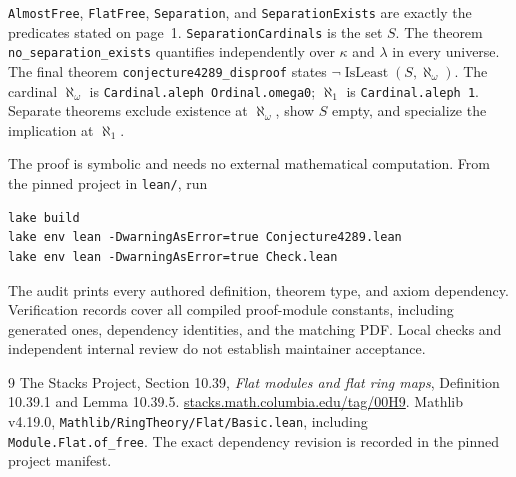 \documentclass[11pt]{article}
\begin{document}
\texttt{AlmostFree}, \texttt{FlatFree}, \texttt{Separation}, and
\texttt{SeparationExists} are exactly the predicates stated on page~1.
\texttt{SeparationCardinals} is the set $S$.
The theorem \texttt{no\_separation\_exists} quantifies independently over
$\kappa$ and $\lambda$ in every universe. The final theorem
\texttt{conjecture4289\_disproof} states
$\neg\operatorname{IsLeast}(S,\aleph_\omega)$.
The cardinal $\aleph_\omega$ is \texttt{Cardinal.aleph Ordinal.omega0};
$\aleph_1$ is \texttt{Cardinal.aleph 1}.
Separate theorems exclude existence at $\aleph_\omega$, show $S$ empty,
and specialize the implication at $\aleph_1$.

The proof is symbolic and needs no external mathematical computation.
From the pinned project in \texttt{lean/}, run
\begin{verbatim}
lake build
lake env lean -DwarningAsError=true Conjecture4289.lean
lake env lean -DwarningAsError=true Check.lean
\end{verbatim}
The audit prints every authored definition, theorem type, and axiom dependency.
Verification records cover all compiled proof-module constants, including
generated ones, dependency identities, and the matching PDF. Local checks and
independent internal review do not establish maintainer acceptance.

\begin{thebibliography}{9}
 The Stacks Project, Section 10.39,
\emph{Flat modules and flat ring maps}, Definition 10.39.1 and Lemma 10.39.5.
\href{https://stacks.math.columbia.edu/tag/00H9}{stacks.math.columbia.edu/tag/00H9}.
 Mathlib v4.19.0,
\texttt{Mathlib/RingTheory/Flat/Basic.lean},
including \texttt{Module.Flat.of\_free}.
The exact dependency revision is recorded in the pinned project manifest.
\end{thebibliography}
\end{document}
